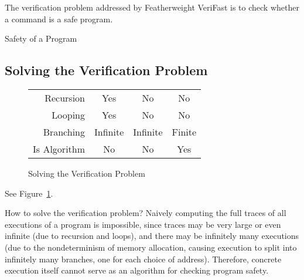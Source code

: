 \documentclass{CSML}
\newenvironment{changemargin}[2]{}{}
\theoremstyle{definition}\newtheorem{notation}[thm]{Notation}
\theoremstyle{plain}\newtheorem{satz}[thm]{Satz}
\begin{document}
The verification problem addressed by Featherweight VeriFast is 
to check whether a command  is a safe program.

\begin{defi}{Safety of a Program}

\end{defi}

\begin{defi}

\end{defi}

\subsection{Solving the Verification Problem}

\begin{figure}

\begin{changemargin}{-1cm}{-1cm}
\begin{center}
\begin{tabular}{| r | c | c | c |}
\hline
&  &  & \\
\hline
Recursion & Yes & No & No\\
Looping & Yes & No & No\\
Branching & Infinite & Infinite & Finite\\
\hline
Is Algorithm & No & No & Yes\\
\hline
\end{tabular} 
\end{center}


\end{changemargin}

\caption{Solving the Verification Problem}\label{fig:solving}
\end{figure}

See Figure~\ref{fig:solving}.

How to solve the verification problem? Naively computing the 
full traces of all executions of a program is impossible, since 
traces may be very large or even infinite (due to recursion and 
loops), and there may be infinitely many executions (due to the 
nondeterminism of memory allocation, causing execution to split 
into infinitely many branches, one for each choice of address). 
Therefore, concrete execution itself cannot serve as an 
algorithm for checking program safety. 
\end{document}
